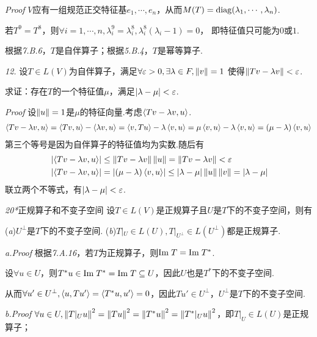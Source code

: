 \textit{Proof}
\(V\)应有一组规范正交特征基\(e_1,\cdots,e_n\)，从而\(M(T)=\mathrm{diag}(\lambda_1,\cdots,\lambda_n)\).

若\(T^9=T^8\)，则\(\forall i=1,\cdots,n,\lambda_i^9=\lambda_i^8,\lambda_i^8(\lambda_i-1)=0\)，
即特征值只可能为\(0\)或\(1\).

根据\textit{7.B.6}，\(T\)是自伴算子；根据\textit{5.B.4}，\(T\)是幂等算子.

\hspace*{\fill}

\textit{12.}
设\(T \in L(V)\)为自伴算子，满足\(\forall \varepsilon>0,\exists \lambda \in F,\left\lVert v \right\rVert=1\)
使得\(\left\lVert Tv-\lambda v \right\rVert<\varepsilon\).

求证：存在\(T\)的一个特征值\(\mu\)，满足\(\left\lvert \lambda-\mu \right\rvert<\varepsilon\).

\textit{Proof}
设\(\left\lVert u \right\rVert=1\)是\(\mu\)的特征向量.考虑\(\left\langle Tv-\lambda v,u \right\rangle\).
    \begin{align*}
        \left\langle Tv-\lambda v,u \right\rangle=\left\langle Tv,u \right\rangle-\left\langle \lambda v,u \right\rangle=\left\langle v,Tu \right\rangle-\lambda \left\langle v,u \right\rangle
        =\mu \left\langle v,u \right\rangle-\lambda \left\langle v,u \right\rangle=(\mu-\lambda)\left\langle v,u \right\rangle
    \end{align*}
第三个等号是因为自伴算子的特征值均为实数.随后有
    \begin{align*}
        &\left\lvert \left\langle Tv-\lambda v,u \right\rangle \right\rvert \leq \left\lVert Tv-\lambda v \right\rVert\left\lVert u \right\rVert=\left\lVert Tv-\lambda v \right\rVert<\varepsilon \\
        &\left\lvert \left\langle Tv-\lambda v,u \right\rangle \right\rvert=\left\lvert (\mu-\lambda)\left\langle v,u \right\rangle \right\rvert \leq \left\lvert \lambda-\mu \right\rvert\left\lVert u \right\rVert\left\lVert v \right\rVert=\left\lvert \lambda-\mu \right\rvert
    \end{align*}
联立两个不等式，有\(\left\lvert \lambda-\mu \right\rvert<\varepsilon\).

\newpage

\textit{20*}{\kaishu 正规算子和不变子空间}
设\(T \in L(V)\)是正规算子且\(U\)是\(T\)下的不变子空间，则有

(\textit{a})\(U^\bot\)是\(T\)下的不变子空间. \quad
(\textit{b})\(T|_U \in L(U),T|_{U^\bot} \in L(U^\bot)\)都是正规算子.

\textit{a.Proof}
根据\textit{7.A.16}，若\(T\)为正规算子，则\(\mathrm{Im \;} T=\mathrm{Im \;} T^*\).

设\(\forall u \in U\)，则\(T^*u \in \mathrm{Im \;} T^*=\mathrm{Im \;} T \subseteq U\)，因此\(U\)也是\(T^*\)下的不变子空间.

从而\(\forall u' \in U^\bot,\left\langle u,Tu' \right\rangle=\left\langle T^*u,u' \right\rangle=0\)，因此\(Tu' \in U^\bot\)，\(U^\bot\)是\(T\)下的不变子空间.

\textit{b.Proof}
\(\forall u \in U,\left\lVert T|_U u \right\rVert^2=\left\lVert Tu \right\rVert^2=\left\lVert T^*u \right\rVert^2=\left\lVert T^*|_U u \right\rVert^2\)，即\(T|_U \in L(U)\)是正规算子；

